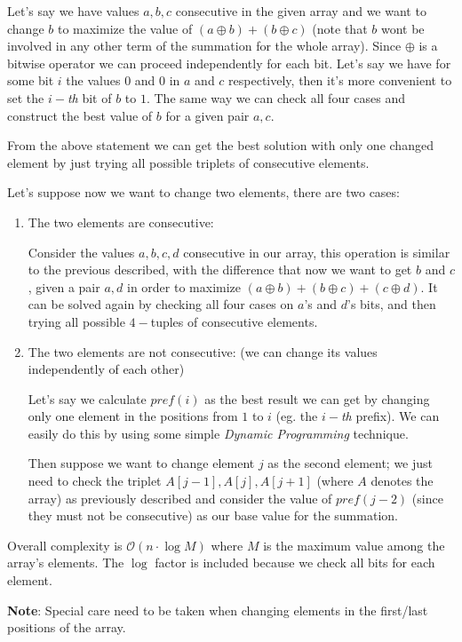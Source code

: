 % 

Let's say we have values $a, b, c$ consecutive in the given array and we want to change $b$ to maximize the value of $(a \oplus b) + (b \oplus c)$ (note that $b$ wont be involved in any other term of the summation for the whole array). Since $\oplus$ is a bitwise operator we can proceed independently for each bit. Let's say we have for some bit $i$ the values $0$ and $0$ in $a$ and $c$ respectively, then it's more convenient to set the $i-$\textit{th} bit of $b$ to $1$. The same way we can check all four cases and construct the best value of $b$ for a given pair $a, c$.  

From the above statement we can get the best solution with only one changed element by just trying all possible triplets of consecutive elements.

Let's suppose now we want to change two elements, there are two cases:
\begin{enumerate}
	\item The two elements are consecutive: 
	
		Consider the values $a, b, c, d$ consecutive in our array, this operation is similar to the previous described, with the difference that now we want to get $b$ and $c$, given a pair $a, d$ in order to maximize $(a \oplus b) + (b \oplus c) + (c \oplus d)$. It can be solved again by checking all four cases on $a$'s and $d$'s bits, and then trying all possible $4-$tuples of consecutive elements.
	
	\item The two elements are not consecutive: (we can change its values independently of each other)
		
		Let's say we calculate $pref(i)$ as the best result we can get by changing only one element in the positions from $1$ to $i$ (eg. the $i-$\textit{th} prefix). We can easily do this by using some simple \textit{Dynamic Programming} technique. 
		
		Then suppose we want to change element $j$ as the second element; we just need to check the triplet $A[j-1], A[j], A[j+1]$ (where $A$ denotes the array) as previously described and consider the value of $pref(j-2)$ (since they must not be consecutive) as our base value for the summation. 
\end{enumerate}

Overall complexity is $\mathcal{O}(n \cdot \log M)$ where $M$ is the maximum value among the array's elements. The $\log$ factor is included because we check all bits for each element. 

\textbf{Note}: Special care need to be taken when changing elements in the first/last positions of the array.

